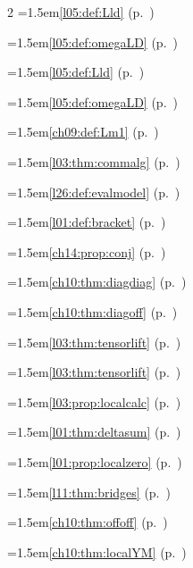 \begin{multicols}{2}
\hangindent=1.5em\quad \ref{l05:def:Lld} (p.~\pageref{l05:def:Lld})\par
\hangindent=1.5em\quad \ref{l05:def:omegaLD} (p.~\pageref{l05:def:omegaLD})\par
\hangindent=1.5em\quad \ref{l05:def:Lld} (p.~\pageref{l05:def:Lld})\par
\hangindent=1.5em\quad \ref{l05:def:omegaLD} (p.~\pageref{l05:def:omegaLD})\par
\hangindent=1.5em\quad \ref{ch09:def:Lm1} (p.~\pageref{ch09:def:Lm1})\par
\hangindent=1.5em\quad \ref{l03:thm:commalg} (p.~\pageref{l03:thm:commalg})\par
\hangindent=1.5em\quad \ref{l26:def:evalmodel} (p.~\pageref{l26:def:evalmodel})\par
\hangindent=1.5em\quad \ref{l01:def:bracket} (p.~\pageref{l01:def:bracket})\par
\hangindent=1.5em\quad \ref{ch14:prop:conj} (p.~\pageref{ch14:prop:conj})\par
\hangindent=1.5em\quad \ref{ch10:thm:diagdiag} (p.~\pageref{ch10:thm:diagdiag})\par
\hangindent=1.5em\quad \ref{ch10:thm:diagoff} (p.~\pageref{ch10:thm:diagoff})\par
\hangindent=1.5em\quad \ref{l03:thm:tensorlift} (p.~\pageref{l03:thm:tensorlift})\par
\hangindent=1.5em\quad \ref{l03:thm:tensorlift} (p.~\pageref{l03:thm:tensorlift})\par
\hangindent=1.5em\quad \ref{l03:prop:localcalc} (p.~\pageref{l03:prop:localcalc})\par
\hangindent=1.5em\quad \ref{l01:thm:deltasum} (p.~\pageref{l01:thm:deltasum})\par
\hangindent=1.5em\quad \ref{l01:prop:localzero} (p.~\pageref{l01:prop:localzero})\par
\hangindent=1.5em\quad \ref{l11:thm:bridges} (p.~\pageref{l11:thm:bridges})\par
\hangindent=1.5em\quad \ref{ch10:thm:offoff} (p.~\pageref{ch10:thm:offoff})\par
\hangindent=1.5em\quad \ref{ch10:thm:localYM} (p.~\pageref{ch10:thm:localYM})\par

\end{multicols}
